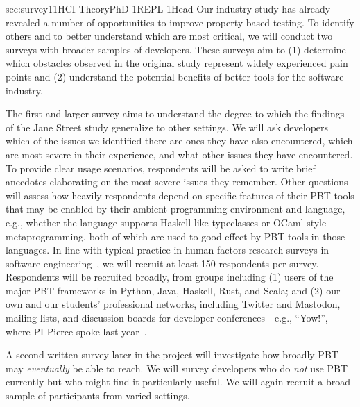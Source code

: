 %
   {sec:survey}{1}{1}{HCI Theory}{PhD 1}{REPL 1}{Head}
%
Our industry study has already revealed
a number of
opportunities to improve property-based testing. To identify
others and to better understand which are most
critical, we will conduct two
surveys with broader samples of developers. These surveys aim to
(1) determine which obstacles observed in the original
study
represent widely experienced pain points and
(2) understand the potential benefits of better tools for the
software industry.

The first and larger survey
aims to understand the degree to which
the findings of the Jane Street study generalize to other settings.
We will
ask developers which of the issues we identified there are
ones they have also encountered, which are most severe
in their experience, and what
other issues they have encountered.
To provide
clear usage scenarios, respondents will
be asked to write brief anecdotes elaborating on the
most severe issues they remember.  Other questions will assess how
heavily respondents depend on specific features of their PBT tools
that may be enabled by their
ambient programming environment and language, e.g., whether the
language supports Haskell-like typeclasses or OCaml-style
metaprogramming, both of which are used to good effect by
PBT tools in those languages.
\iflater{}\fi{} In line with typical practice in
human factors research surveys in software
engineering~\cite{ref:robillard2009makes,ref:uddin2015api,ref:murphyhill2019predicts},
we will recruit at least 150 respondents per survey.
Respondents will
be recruited broadly, from groups including
(1)
users of the major PBT frameworks in Python, Java, Haskell, Rust, and
Scala; and
(2) our own and our students' professional networks, including
Twitter and Mastodon, mailing lists, and discussion boards for developer
conferences---e.g., ``Yow!'', where PI Pierce spoke last
year~\cite{Pierce:Yow22}.

A second written survey later in the project will investigate
how broadly PBT may {\em eventually} be able to reach.  We will
survey developers who do {\em not} use PBT
currently but who might find it particularly useful.
We will again recruit a broad sample of participants from varied settings.


%

